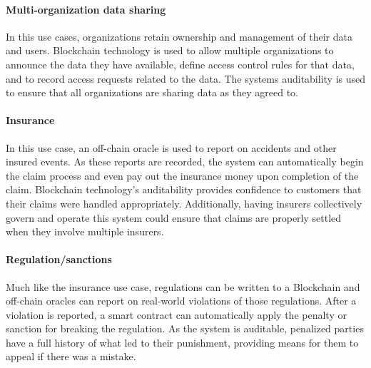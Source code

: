 \paragraph{Multi-organization data sharing}
In this use cases, organizations retain ownership and management of their data and users.
Blockchain technology is used to allow multiple organizations to announce the data they have available, define access control rules for that data, and to record access requests related to the data.
The systems auditability is used to ensure that all organizations are sharing data as they agreed to.

\paragraph{Insurance}
In this use case, an off-chain oracle is used to report on accidents and other insured events.
As these reports are recorded, the system can automatically begin the claim process and even pay out the insurance money upon completion of the claim.
Blockchain technology's auditability provides confidence to customers that their claims were handled appropriately.
Additionally, having insurers collectively govern and operate this system could ensure that claims are properly settled when they involve multiple insurers.

\paragraph{Regulation/sanctions}
Much like the insurance use case, regulations can be written to a Blockchain and off-chain oracles can report on real-world violations of those regulations.
After a violation is reported, a smart contract can automatically apply the penalty or sanction for breaking the regulation.
As the system is auditable, penalized parties have a full history of what led to their punishment, providing means for them to appeal if there was a mistake.



